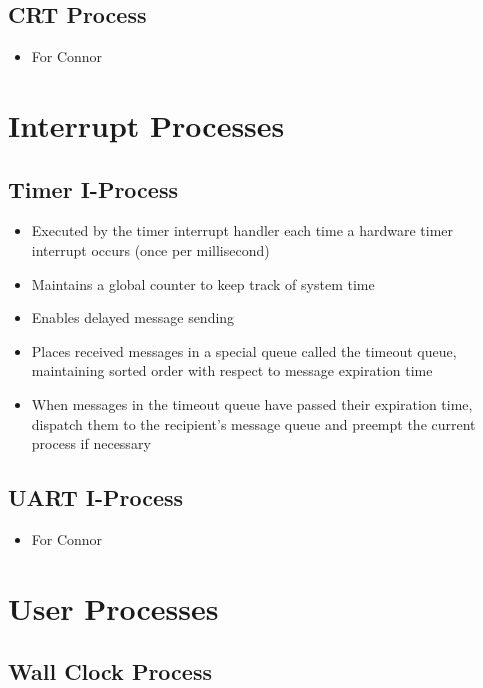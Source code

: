 \documentclass[12pt]{report}
\begin{document}
\subsection{CRT Process}

\begin{itemize}
    \item For Connor
\end{itemize}

\section{Interrupt Processes}

\subsection{Timer I-Process}

\begin{itemize}
    \item Executed by the timer interrupt handler each time a hardware timer interrupt occurs (once per millisecond)
    \item Maintains a global counter to keep track of system time
    \item Enables delayed message sending
    \item Places received messages in a special queue called the timeout queue, maintaining sorted order with respect to message expiration time
    \item When messages in the timeout queue have passed their expiration time, dispatch them to the recipient's message queue and preempt the current process if necessary
\end{itemize}

\subsection{UART I-Process}

\begin{itemize}
    \item For Connor
\end{itemize}

\section{User Processes}

\subsection{Wall Clock Process}
\end{document}
